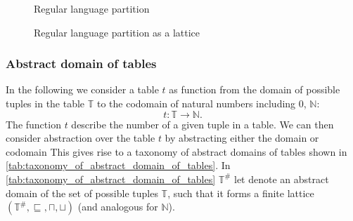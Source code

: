 \begin{figure}
    \center
    \caption{Regular language partition}
    \label{fig:tikz-reg-partition}
\end{figure}


\begin{figure}[!htb]
    \center
    \caption{Regular language partition as a lattice}
    \label{fig:tikz-reg-partition-lattice}
\end{figure}

\subsubsection{Abstract domain of tables}\label{subsubsec:abstract_domain_of_tables}

In the following we consider a table $t$ as function from the domain of possible tuples in the table $\mathbb{T}$ to the codomain of natural numbers including $0$, $\mathbb{N}$:
\begin{equation}
    t : \mathbb{T} \rightarrow \mathbb{N}.
\end{equation}
The function $t$ describe the number of a given tuple in a table.
We can then consider abstraction over the table $t$ by abstracting either the domain or codomain
This gives rise to a taxonomy of abstract domains of tables shown in \autoref{tab:taxonomy_of_abstract_domain_of_tables}.
In \autoref{tab:taxonomy_of_abstract_domain_of_tables} $\mathbb{T}^\#$ let denote an abstract domain of the set of possible tuples $\mathbb{T}$, such that it forms a finite lattice $(\mathbb{T}^\#, \sqsubseteq, \sqcap, \sqcup)$ (and analogous for $\mathbb{N}$).

